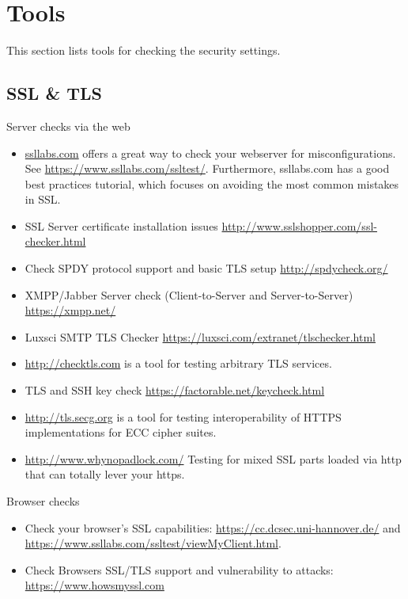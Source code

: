 \chapter{Tools}
\label{cha:tools}
This section lists tools for checking the security settings.

\section{SSL \& TLS}

Server checks via the web
\begin{itemize}
\item \href{http://ssllabs.com}{ssllabs.com} offers a great way to check your webserver for misconfigurations. See \url{https://www.ssllabs.com/ssltest/}. Furthermore, ssllabs.com has a good best practices tutorial, which focuses on avoiding the most common mistakes in SSL.
\item SSL Server certificate installation issues \url{http://www.sslshopper.com/ssl-checker.html}
\item Check SPDY protocol support and basic TLS setup \url{http://spdycheck.org/}
\item XMPP/Jabber Server check (Client-to-Server and Server-to-Server) \url{https://xmpp.net/}
\item Luxsci SMTP TLS Checker \url{https://luxsci.com/extranet/tlschecker.html}
\item \url{http://checktls.com} is a tool for testing arbitrary TLS services.
\item TLS and SSH key check \url{https://factorable.net/keycheck.html}
\item \url{http://tls.secg.org} is a tool for testing interoperability of HTTPS implementations for ECC cipher suites.
\item \url{http://www.whynopadlock.com/} Testing for mixed SSL parts loaded via http that can totally lever your https.
\end{itemize}

Browser checks
\begin{itemize}
\item Check your browser's SSL capabilities: \url{https://cc.dcsec.uni-hannover.de/} and \url{https://www.ssllabs.com/ssltest/viewMyClient.html}.
\item Check Browsers SSL/TLS support and vulnerability to attacks: \url{https://www.howsmyssl.com}
\end{itemize}


